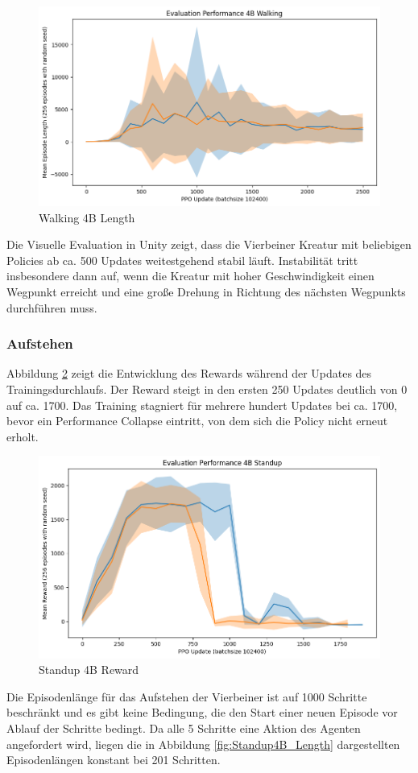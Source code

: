 \begin{figure}[ht]
    \centering
    \includegraphics[width=0.5\linewidth]{resources/img/results/Walking4B_Length.png}
    \caption{Walking 4B Length}\label{fig:Walking4B_Length}
\end{figure}

Die Visuelle Evaluation in Unity zeigt, dass die Vierbeiner Kreatur mit beliebigen Policies ab ca. 500 Updates weitestgehend stabil läuft. Instabilität tritt insbesondere dann auf, wenn die Kreatur mit hoher Geschwindigkeit einen Wegpunkt erreicht und eine große Drehung in Richtung des nächsten Wegpunkts durchführen muss. 

\subsubsection{Aufstehen}
Abbildung \ref{fig:Standup4B_Reward} zeigt die Entwicklung des Rewards während der Updates des Trainingsdurchlaufs. Der Reward steigt in den ersten 250 Updates deutlich von 0 auf ca. 1700. Das Training stagniert für mehrere hundert Updates bei ca. 1700, bevor ein Performance Collapse eintritt, von dem sich die Policy nicht erneut erholt.

\begin{figure}[ht]
    \centering
    \includegraphics[width=0.5\linewidth]{resources/img/results/Standup4B_Reward.png}
    \caption{Standup 4B Reward}\label{fig:Standup4B_Reward}
\end{figure}

Die Episodenlänge für das Aufstehen der Vierbeiner ist auf 1000 Schritte beschränkt und es gibt keine Bedingung, die den Start einer neuen Episode vor Ablauf der Schritte bedingt. Da alle 5 Schritte eine Aktion des Agenten angefordert wird, liegen die in Abbildung \ref{fig:Standup4B_Length} dargestellten Episodenlängen konstant bei 201 Schritten.


